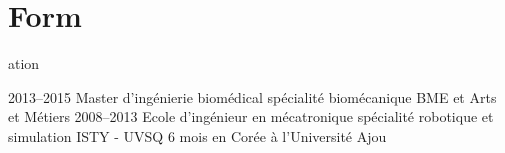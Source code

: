 \documentclass{cv-style}     %
\begin{document}

\section{Form}{ation}

\begin{entrylist}
\entry
{2013--2015}
{Master d'ingénierie biomédical {\normalfont spécialité biomécanique}}
{BME et Arts et Métiers}
{}
\entry
{2008--2013}
{Ecole d'ingénieur en mécatronique {\normalfont spécialité robotique et simulation}}
{ISTY - UVSQ}
{6 mois en Corée à l'Université Ajou}
\end{entrylist}





%

\end{document}
